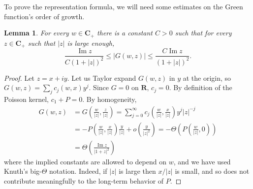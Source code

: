 \documentclass[12pt]{report}
\newcommand{\RR}{\mathbf{R}}
\newcommand{\CC}{\mathbf{C}}
\renewcommand{\Im}{\operatorname{Im}}
\newtheorem{lemma}[theorem]{Lemma}
\theoremstyle{definition}
\theoremstyle{remark}
\begin{document}
To prove the representation formula, we will need some estimates on the Green function's order of growth.
\begin{lemma}
\label{estimate on Green function}
    For every $w \in \CC_+$ there is a constant $C > 0$ such that for every $z \in \CC_+$ such that $|z|$ is large enough,
$$\frac{\Im z}{C(1 + |z|)^2} \leq |G(w, z)| \leq \frac{C \Im z}{(1 + |z|)^2}.$$
\end{lemma}
\begin{proof}
  Let $z = x + iy$. Let us Taylor expand $G(w, z)$ in $y$ at the origin, so $G(w, z) = \sum_j c_j(w, x) y^j$. Since $G = 0$ on $\RR$, $c_j = 0$. By definition of the Poisson kernel, $c_1 + P = 0$. By homogeneity,
\begin{align*}
  G(w, z) &= G\left(\frac{w}{|z|}, \frac{z}{|z|}\right) = \sum_{j=0}^\infty c_j\left(\frac{w}{|z|}, \frac{x}{|z|}\right) y^j |z|^{-j}
  \\&= -P\left(\frac{w}{|z|}, \frac{x}{|z|}\right) \frac{y}{|z|} + o\left(\frac{y}{|z|^2} \right) = -\Theta\left(P\left(\frac{w}{|z|}, 0\right)\right)
  \\&= \Theta \left(\frac{\Im z}{|1 + z|^2}\right)
\end{align*}
  where the implied constants are allowed to depend on $w$, and we have used Knuth's big-$\Theta$ notation. Indeed, if $|z|$ is large then $x/|z|$ is small, and so does not contribute meaningfully to the long-term behavior of $P$.
\end{proof}
\end{document}
